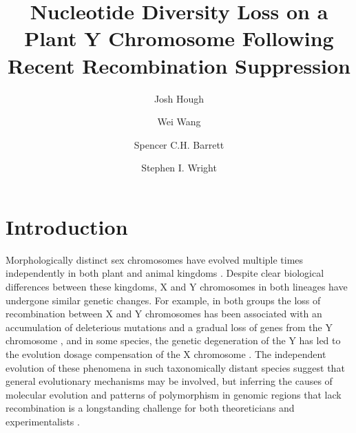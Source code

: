 \documentclass[9pt,twocolumn,twoside]{gsajnl}
\title{Nucleotide Diversity Loss on a Plant Y Chromosome Following Recent Recombination Suppression}
\author[$\ast$,$\dagger$,1]{Josh Hough}
\author[$\dagger$]{Wei Wang}
\author[$\dagger$]{Spencer C.H. Barrett}
\author[$\dagger$]{Stephen I. Wright}
\affil[$\ast$]{Department of Plant Sciences, University of California, Davis}
\affil[$\dagger$]{Department of Ecology and Evolutionary Biology, University of Toronto}
\begin{document}
\maketitle
\thispagestyle{firststyle}
\marginmark
\firstpagefootnote
{}
\vspace{-11pt}

\section*{Introduction}

\lettrine[lines=2]{\color{color2}M}{}orphologically distinct sex chromosomes have evolved multiple times independently in both plant and animal kingdoms \citep{westergaard1958,ohno1967,bull1983,charlesworth1991}. Despite clear biological differences between these kingdoms, X and Y chromosomes in both lineages have undergone similar genetic changes. For example, in both groups the loss of recombination between X and Y chromosomes has been associated with an accumulation of deleterious mutations and a gradual loss of genes from the Y chromosome \citep{hough2014,bergero2015,bachtrog2013NRG}, and in some species, the genetic degeneration of the Y has led to the evolution dosage compensation of the X chromosome \citep{charlesworth1996CB,muyle2012,mank2013sex,papadopulos2015}. The independent evolution of these phenomena in such taxonomically distant species suggest that general evolutionary mechanisms may be involved, but inferring the causes of molecular evolution and patterns of polymorphism in genomic regions that lack recombination is a longstanding challenge for both theoreticians and experimentalists \citep{charlesworth1978,feldman1980evolution,barton1995general,charlesworth1996CB,otto1997deleterious,charlesworth2000degeneration,mcvean2000effects}.
\end{document}
